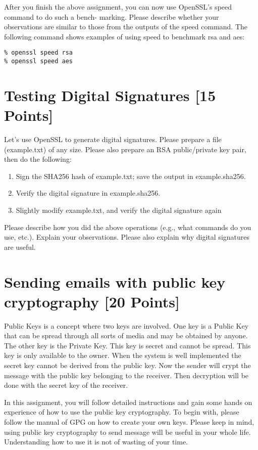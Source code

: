 \documentclass[11pt]{article}
\begin{document}
After you finish the above assignment, you can now use OpenSSL's speed command to do such a bench-
marking. Please describe whether your observations are similar to those from the outputs of the speed
command. The following command shows examples of using speed to benchmark rsa and aes:

\begin{lstlisting}
% openssl speed rsa
% openssl speed aes
\end{lstlisting}




\section{Testing Digital Signatures [15 Points]}
Let's use OpenSSL to generate digital signatures. Please prepare a file (example.txt) of
any size. Please also prepare an RSA public/private key pair, then do the following:
\begin{enumerate}
\item Sign the SHA256 hash of example.txt; save the output in example.sha256.
\item Verify the digital signature in example.sha256.
\item Slightly modify example.txt, and verify the digital signature again
\end{enumerate}
Please describe how you did the above operations (e.g., what commands do you use, etc.). Explain your
observations. Please also explain why digital signatures are useful.



\vspace{1in}

\section{Sending emails with public key cryptography [20 Points]}

Public Keys is a concept where two keys are involved. One key is a Public Key that can be spread through all sorts of media and may be obtained by anyone. The other key is the Private Key. This key is secret and cannot be spread. This key is only available to the owner. When the system is well implemented the secret key cannot be derived from the public key. Now the sender will crypt the message with the public key belonging to the receiver. Then decryption will be done with the secret key of the receiver.

In this assignment, you will follow detailed instructions and gain some hands on experience of how to use the public key cryptography. To begin with, please follow the manual of GPG on how to create your own keys. Please keep in mind, using public key cryptography to send message will be useful in your whole life. Understanding how to use it is not of wasting of your time.
\end{document}
